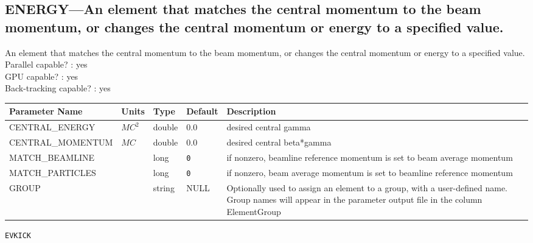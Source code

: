 \subsection{ENERGY---An element that matches the central momentum to the beam momentum, or changes the central momentum or energy to a specified value.}
An element that matches the central momentum to the beam momentum, or changes the central momentum or energy to a specified value.
\\
Parallel capable? : yes\\
GPU capable? : yes\\
Back-tracking capable? : yes\\
\begin{tabular}{|l|l|l|l|p{\descwidth}|} \hline
Parameter Name & Units & Type & Default & Description \\ \hline 
CENTRAL\_ENERGY & $MC^{2}$ & double &  0.0 & desired central gamma  \\ \hline 
CENTRAL\_MOMENTUM & $MC$ & double &  0.0 & desired central beta*gamma  \\ \hline 
MATCH\_BEAMLINE &  & long &  \verb|0| & if nonzero, beamline reference momentum is set to beam average momentum  \\ \hline 
MATCH\_PARTICLES &  & long &  \verb|0| & if nonzero, beam average momentum is set to beamline reference momentum  \\ \hline 
GROUP &  & string & NULL & Optionally used to assign an element to a group, with a user-defined name.  Group names will appear in the parameter output file in the column ElementGroup  \\ \hline 
\end{tabular}

\newpage
\begin{center}{\Large\verb|EVKICK|}\end{center}
